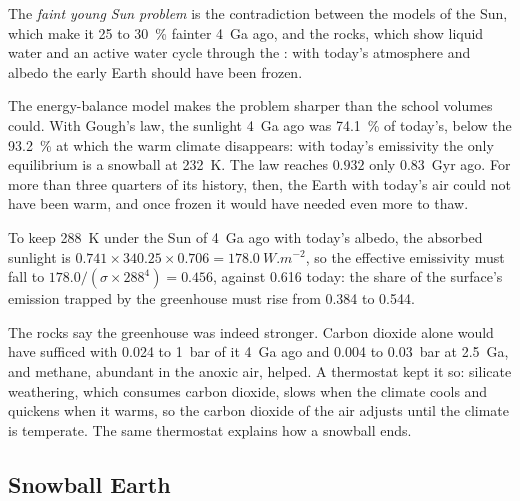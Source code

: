 \begin{definition}\label{def:b2:precambrian-earth:faint-sun}
The \emph{faint young Sun problem} is the contradiction between
the models of the Sun, which make it 25 to \qty{30}{\percent} fainter \qty{4}{Ga} ago, and the
rocks, which show liquid water and an active water cycle through the : with today's
atmosphere and albedo the early Earth should have been frozen.
\end{definition}

The energy-balance model makes the problem sharper than the school volumes could. With Gough's
law, the sunlight \qty{4}{Ga} ago was \qty{74.1}{\percent} of today's, below the
\qty{93.2}{\percent} at which the warm climate disappears: with today's emissivity the only
equilibrium is a snowball at \qty{232}{K}. The law reaches $0.932$ only
\qty{0.83}{Gyr} ago. For more than three quarters of its history, then, the Earth with
today's air could not have been warm, and once frozen it would have needed even more to thaw.

\begin{example}\label{ex:b2:precambrian-earth:young-greenhouse}
To keep \qty{288}{K} under the Sun of \qty{4}{Ga} ago with today's albedo, the absorbed
sunlight is $0.741\times340.25\times0.706 = \qty{178.0}{W.m^{-2}}$, so the effective emissivity
must fall to $178.0/(\sigma\times288^4) = 0.456$, against 0.616 today: the share of the
surface's emission trapped by the greenhouse must rise from 0.384 to 0.544.
\end{example}

The rocks say the greenhouse was indeed stronger. Carbon dioxide alone would have sufficed with
0.024 to \qty{1}{bar} of it \qty{4}{Ga} ago and 0.004 to \qty{0.03}{bar} at \qty{2.5}{Ga}, and
methane, abundant in the anoxic air, helped. A thermostat kept it so: silicate weathering,
which consumes carbon dioxide, slows when the climate cools and quickens when it warms, so the
carbon dioxide of the air adjusts until the climate is temperate. The same thermostat explains
how a snowball ends.

\subsection*{Snowball Earth}

